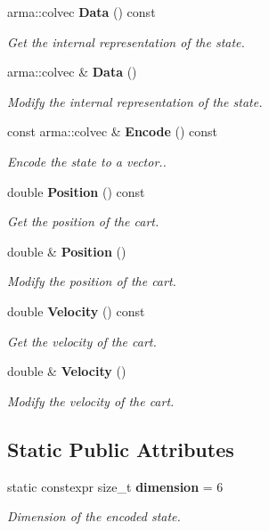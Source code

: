 \begin{DoxyCompactItemize}
arma\+::colvec \textbf{ Data} () const
\begin{DoxyCompactList}\small\item\em Get the internal representation of the state. \end{DoxyCompactList}\item 
arma\+::colvec \& \textbf{ Data} ()
\begin{DoxyCompactList}\small\item\em Modify the internal representation of the state. \end{DoxyCompactList}\item 
const arma\+::colvec \& \textbf{ Encode} () const
\begin{DoxyCompactList}\small\item\em Encode the state to a vector.. \end{DoxyCompactList}\item 
double \textbf{ Position} () const
\begin{DoxyCompactList}\small\item\em Get the position of the cart. \end{DoxyCompactList}\item 
double \& \textbf{ Position} ()
\begin{DoxyCompactList}\small\item\em Modify the position of the cart. \end{DoxyCompactList}\item 
double \textbf{ Velocity} () const
\begin{DoxyCompactList}\small\item\em Get the velocity of the cart. \end{DoxyCompactList}\item 
double \& \textbf{ Velocity} ()
\begin{DoxyCompactList}\small\item\em Modify the velocity of the cart. \end{DoxyCompactList}\end{DoxyCompactItemize}
\subsection*{Static Public Attributes}
\begin{DoxyCompactItemize}
\item 
static constexpr size\+\_\+t \textbf{ dimension} = 6
\begin{DoxyCompactList}\small\item\em Dimension of the encoded state. \end{DoxyCompactList}\end{DoxyCompactItemize}


